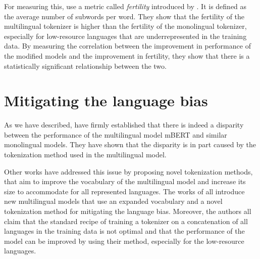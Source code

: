 For measuring this, \citet{rust_how_2021} use a metric called \textit{fertility} introduced by \citet{acs_exploring_2019}. It is defined as the average number of subwords per word. They show that the fertility of the multilingual tokenizer is higher than the fertility of the monolingual tokenizer, especially for low-resource languages that are underrepresented in the training data. By measuring the correlation between the improvement in performance of the modified models and the improvement in fertility, they show that there is a statistically significant relationship between the two.


\section{Mitigating the language bias}

As we have described, \citet{rust_how_2021} have firmly established that there is indeed a disparity between the performance of the multilingual model mBERT and similar monolingual models. They have shown that the disparity is in part caused by the tokenization method used in the multilingual model.

Other works have addressed this issue by proposing novel tokenization methods, that aim to improve the vocabulary of the multilingual model and increase its size to accommodate for all represented languages. The works of \citet{chung_improving_2020,zheng_allocating_2021,liang_xlm-v_2023} all introduce new multilingual models that use an expanded vocabulary and a novel tokenization method for mitigating the language bias. Moreover, the authors all claim that the standard recipe of training a tokenizer on a concatenation of all languages in the training data is not optimal and that the performance of the model can be improved by using their method, especially for the low-resource languages. 

